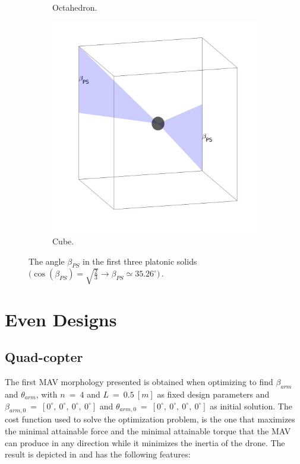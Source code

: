 \begin{figure}[!ht]
\begin{subfigure}[b]{0.32\textwidth}
    \caption{Octahedron.} \label{fig:octahedron}
  \end{subfigure}
  \hspace*{\fill} %
  \begin{subfigure}[b]{0.32\textwidth}
    \includegraphics[width=\linewidth]{images/cube.jpg}
    \caption{Cube.} \label{fig:cube}
  \end{subfigure}
  \caption{The angle $\beta_{PS}$ in the first three platonic solids $\big(\cos(\beta_{PS}) = \sqrt{\frac{2}{3}}
  \rightarrow \beta_{PS} \simeq 35.26^{\circ}\big)\, .$}
  \label{fig:platonic_solid}
\end{figure}

\section{Even Designs}
\label{sec:even_designs}

\subsection{Quad-copter}
\label{sec:quad_copter}

The first MAV morphology presented is obtained when optimizing to find
$\beta_{arm}$ and $\theta_{arm}$, with $n\ =\ 4$ and $L\ =\ 0.5\ [m]$ as fixed design
parameters and $\beta_{arm,0} \ =\ [0^{\circ}, \  0^{\circ},\  0^{\circ},\ 0^{\circ}]$
and $\theta_{arm,0}\ =\ [0^{\circ},\  0^{\circ},\  0^{\circ},\  0^{\circ}]$ as
initial solution. The cost function used to solve the optimization problem, is the
one that maximizes the minimal attainable force and the minimal attainable torque that
the MAV can produce in any direction while it minimizes the inertia of the drone.
The result is depicted in  and has the following features:

